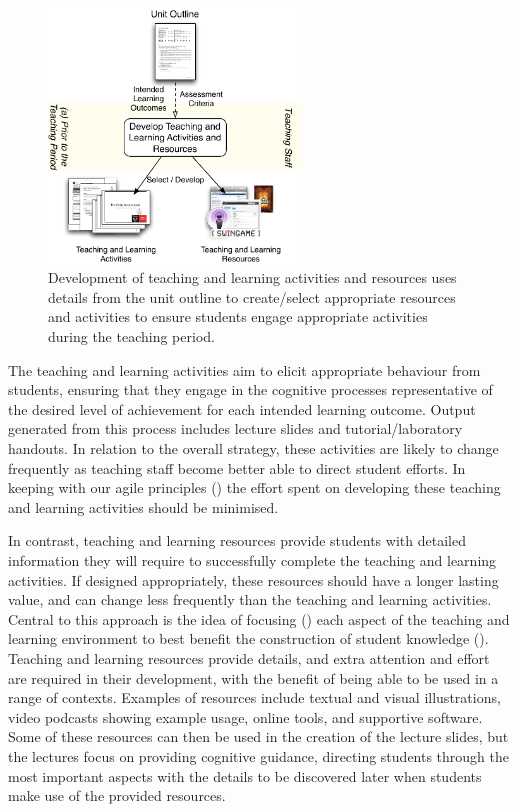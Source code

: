 \begin{figure}[htbp]
	\centering
	\includegraphics[width=0.6\textwidth]{DevelopTLAR}
	\caption{Development of teaching and learning activities and resources uses details from the unit outline to create/select appropriate resources and activities to ensure students engage appropriate activities during the teaching period.}
	\label{fig:develop_tlar}
\end{figure}

The teaching and learning activities aim to elicit appropriate behaviour from students, ensuring that they engage in the cognitive processes representative of the desired level of achievement for each intended learning outcome. Output generated from this process includes lecture slides and tutorial/laboratory handouts. In relation to the overall strategy, these activities are likely to change frequently as teaching staff become better able to direct student efforts. In keeping with our agile principles () the effort spent on developing these teaching and learning activities should be minimised.

In contrast, teaching and learning resources provide students with detailed information they will require to successfully complete the teaching and learning activities. If designed appropriately, these resources should have a longer lasting value, and can change less frequently than the teaching and learning activities. Central to this approach is the idea of focusing () each aspect of the teaching and learning environment to best benefit the construction of student knowledge (). Teaching and learning resources provide details, and extra attention and effort are required in their development, with the benefit of being able to be used in a range of contexts. Examples of resources include textual and visual illustrations, video podcasts showing example usage, online tools, and supportive software. Some of these resources can then be used in the creation of the lecture slides, but the lectures focus on providing cognitive guidance, directing students through the most important aspects with the details to be discovered later when students make use of the provided resources.

